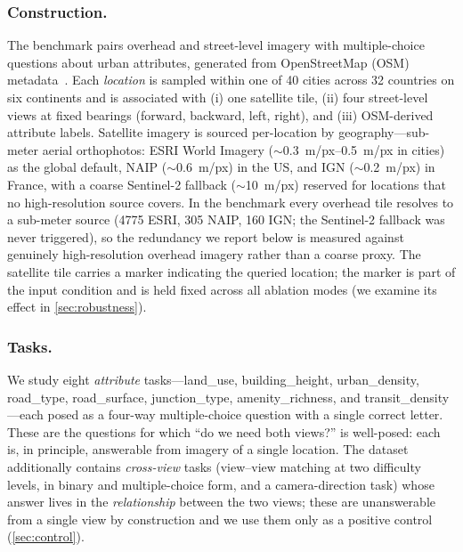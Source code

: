 \documentclass[runningheads]{llncs}
\begin{document}
\subsubsection{Construction.}
The benchmark pairs overhead and street-level imagery with multiple-choice
questions about urban attributes, generated from OpenStreetMap (OSM)
metadata~\cite{osm}. Each \emph{location} is sampled within one of \num{40}
cities across \num{32} countries on six continents and is associated with (i) one
satellite tile, (ii) four street-level views at fixed bearings (forward,
backward, left, right), and (iii) OSM-derived attribute labels. Satellite imagery
is sourced per-location by geography---sub-meter aerial orthophotos: ESRI World
Imagery ($\sim$\SIrange{0.3}{0.5}{m/px} in cities) as the global default, NAIP
($\sim$\SI{0.6}{m/px}) in the US, and IGN ($\sim$\SI{0.2}{m/px}) in France, with a
coarse Sentinel-2 fallback ($\sim$\SI{10}{m/px}) reserved for locations that no
high-resolution source covers. In the benchmark every overhead tile resolves to a
sub-meter source (\num{4775} ESRI, \num{305} NAIP, \num{160} IGN; the Sentinel-2
fallback was never triggered), so the redundancy we report below is measured
against genuinely high-resolution overhead imagery rather than a coarse proxy.
The satellite tile carries a marker indicating the queried location; the marker
is part of the input condition and is held fixed across all ablation modes (we
examine its effect in \cref{sec:robustness}).

\subsubsection{Tasks.}
We study eight \emph{attribute} tasks---\textsf{land\_use},
\textsf{building\_height}, \textsf{urban\_density}, \textsf{road\_type},
\textsf{road\_surface}, \textsf{junction\_type}, \textsf{amenity\_richness}, and
\textsf{transit\_density}---each posed as a four-way multiple-choice question
with a single correct letter. These are the questions for which ``do we need both
views?'' is well-posed: each is, in principle, answerable from imagery of a
single location. The dataset additionally contains \emph{cross-view} tasks
(view--view matching at two difficulty levels, in binary and multiple-choice
form, and a camera-direction task) whose answer lives in the \emph{relationship}
between the two views; these are unanswerable from a single view by construction
and we use them only as a positive control (\cref{sec:control}).
\end{document}
